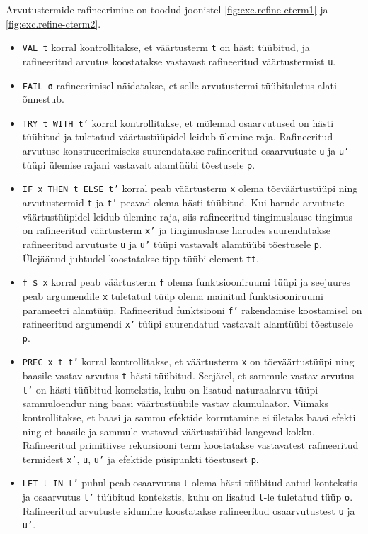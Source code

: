 \documentclass[a4paper,12pt]{article}
\begin{document}
Arvutustermide rafineerimine on toodud joonistel \ref{fig:exc.refine-cterm1} ja \ref{fig:exc.refine-cterm2}.
\begin{itemize}
\item {\tt VAL t} korral kontrollitakse, et väärtusterm {\tt t} on hästi tüübitud, ja rafineeritud arvutus koostatakse vastavast rafineeritud väärtustermist {\tt u}.
\item {\tt FAIL σ} rafineerimisel näidatakse, et selle arvutustermi tüübituletus alati õnnestub.
\item {\tt TRY t WITH t'} korral kontrollitakse, et mõlemad osaarvutused on hästi tüübitud ja tuletatud väärtustüüpidel leidub ülemine raja. Rafineeritud arvutuse konstrueerimiseks suurendatakse rafineeritud osaarvutuste {\tt u} ja {\tt u'} tüüpi ülemise rajani vastavalt alamtüübi tõestusele {\tt p}.
\item {\tt IF x THEN t ELSE t'} korral peab väärtusterm {\tt x} olema tõeväärtustüüpi ning arvutustermid {\tt t} ja {\tt t'} peavad olema hästi tüübitud. Kui harude arvutuste väärtustüüpidel leidub ülemine raja, siis rafineeritud tingimuslause tingimus on rafineeritud väärtusterm {\tt x'} ja tingimuslause harudes suurendatakse rafineeritud arvutuste {\tt u} ja {\tt u'} tüüpi vastavalt alamtüübi tõestusele {\tt p}. Ülejäänud juhtudel koostatakse tipp-tüübi element {\tt tt}.
\item {\tt f \$ x} korral peab väärtusterm {\tt f} olema funktsiooniruumi tüüpi ja seejuures peab argumendile {\tt x} tuletatud tüüp olema mainitud funktsiooniruumi parameetri alamtüüp. Rafineeritud funktsiooni {\tt f'} rakendamise koostamisel on rafineeritud argumendi {\tt x'} tüüpi suurendatud vastavalt alamtüübi tõestusele {\tt p}.
\item {\tt PREC x t t'} korral kontrollitakse, et väärtusterm {\tt x} on tõeväärtustüüpi ning baasile vastav arvutus {\tt t} hästi tüübitud. Seejärel, et sammule vastav arvutus {\tt t'} on hästi tüübitud kontekstis, kuhu on lisatud naturaalarvu tüüpi sammuloendur ning baasi väärtustüübile vastav akumulaator. Viimaks kontrollitakse, et baasi ja sammu efektide korrutamine ei ületaks baasi efekti ning et baasile ja sammule vastavad väärtustüübid langevad kokku. Rafineeritud primitiivse rekursiooni term koostatakse vastavatest rafineeritud termidest {\tt x'}, {\tt u}, {\tt u'} ja efektide püsipunkti tõestusest {\tt p}.
\item {\tt LET t IN t'} puhul peab osaarvutus {\tt t} olema hästi tüübitud antud kontekstis ja osaarvutus {\tt t'} tüübitud kontekstis, kuhu on lisatud {\tt t}-le tuletatud tüüp {\tt σ}. Rafineeritud arvutuste sidumine koostatakse rafineeritud osaarvutustest {\tt u} ja {\tt u'}.
\end{itemize}
\end{document}
